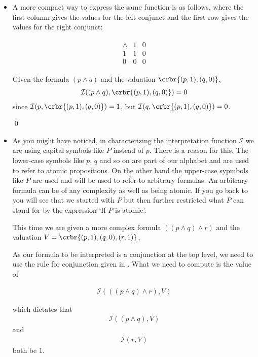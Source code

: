 \documentclass[11pt]{article}
\begin{document}
\begin{itemize}
\item A more compact way to express the same function is as follows, where the first column
gives the values for the left conjunct and the first row gives the values for
the right conjunct:

\begin{align}
\begin{array}{c|cc}
\land & 1 & 0 \\ \hline
1 &1 &0 \\
0 &0 &0  
\end{array}
\end{align}

\hrulefill
\begin{uexample}\label{exconj1}
Given the formula $(p\land q)$ and the valuation $\crbr{(p,1),(q,0)}$,
\begin{align}
\mathcal{I}((p\land q), \crbr{(p,1),(q,0)}) = 0 
\end{align}
since $\mathcal{I}(p,\crbr{(p,1),(q,0)}) = 1$, but
$\mathcal{I}(q,\crbr{(p,1),(q,0)}) = 0$.

\qed
\end{uexample}
\hrulefill

\item As you might have noticed, in characterizing the interpretation function
$\mathcal{I}$ we are using capital symbols like $P$ instead of $p$. There is a
reason for this. The lower-case symbols like $p$, $q$ and so on are part of our
alphabet and are used to refer to atomic propositions. On the other hand the
upper-case sypmbols like $P$ are used and will be used to refer to arbitrary
formulas. An arbitrary formula can be of any complexity as well as being atomic.
If you go back to  you will see that we started with $P$ but then
further restricted what $P$ can stand for by the expression `If $P$ is atomic'.

\hrulefill
\begin{uexample}\label{exconj2}
This time we are given a more complex formula $((p\land q)\land r)$ and the
valuation $V=\crbr{(p,1),(q,0),(r,1)}$,

As our formula to be interpreted is a conjunction at the top level, we need to
use the rule for conjunction given in . What we need to compute is
the value of 

\begin{align}\label{a0}
\mathcal{I}(((p\land q)\land r), V) 
\end{align}

which dictates that 
\begin{align}\label{a1}
\mathcal{I}((p\land q), V) 
\end{align}
and 
\begin{align}\label{a2}
\mathcal{I}(r, V) 
\end{align}
both be 1.


\end{uexample}
\end{itemize}
\end{document}
